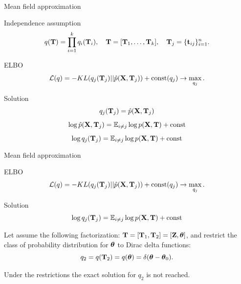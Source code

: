 \begin{frame}{Mean field approximation}   
	 \begin{block}{Independence assumption}
		\vspace{-0.3cm}
		\[
		q(\mathbf{T}) = \prod_{i=1}^k q_i(\mathbf{T}_i), \quad \mathbf{T} = [\mathbf{T}_1, \dots, \mathbf{T}_k], \quad \mathbf{T}_j = \{ \mathbf{t}_{ij}\}_{i=1}^n.
		\]
		\vspace{-0.3cm}
	\end{block}
	\begin{block}{ELBO}
		\vspace{-0.3cm}
	    \[
			\mathcal{L} (q) = - KL (q_j(\mathbf{T}_j) || \hat{p}(\mathbf{X}, \mathbf{T}_j))  + \text{const}(q_j) \rightarrow \max_{q_j}.
	    \]
	    \vspace{-0.3cm}
	\end{block}
	 \begin{block}{Solution}
	 	\vspace{-0.3cm}
		 \[
		    q_j(\mathbf{T}_j) = \hat{p}(\mathbf{X}, \mathbf{T}_j)
		 \]
		 \[
		 	\log \hat{p}(\mathbf{X}, \mathbf{T}_j) = \mathbb{E}_{i \neq j} \log p(\mathbf{X}, \mathbf{T}) + \text{const}
		 \]
		 \[
		     \log q_j(\mathbf{T}_j) = \mathbb{E}_{i \neq j} \log p(\mathbf{X}, \mathbf{T}) + \text{const}
		 \]
		 \vspace{-0.3cm}
	 \end{block}
\end{frame}
\begin{frame}{Mean field approximation}
	\begin{block}{ELBO}
		\[
			\mathcal{L} (q) = - KL (q_j(\mathbf{T}_j) || \hat{p}(\mathbf{X}, \mathbf{T}_j))  + \text{const}(q_j) \rightarrow \max_{q_j}.
		\]
		\vspace{-0.3cm}
	\end{block}
	\begin{block}{Solution}
		\vspace{-0.3cm}
		\[
			\log q_j(\mathbf{T}_j) = \mathbb{E}_{i \neq j} \log p(\mathbf{X}, \mathbf{T}) + \text{const}
		\]
		\vspace{-0.3cm}
	\end{block}
	Let assume the following factorization: $\mathbf{T} = [\mathbf{T}_1, \mathbf{T}_2] = [\mathbf{Z}, \boldsymbol{\theta}]$, and restrict the class of probability distribution for $\boldsymbol{\theta}$ to Dirac delta functions:
	\[
		q_2 = q(\mathbf{T}_2) = q(\boldsymbol{\theta}) = \delta(\boldsymbol{\theta} - \boldsymbol{\theta}_0).
	\]
	
	Under the restrictions the exact solution for $q_2$ is not reached.
\end{frame}
